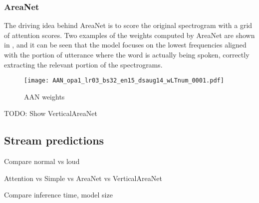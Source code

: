 \subsubsection{AreaNet}

The driving idea behind AreaNet is to score the original spectrogram with a
grid of attention scores. Two examples of the weights computed by AreaNet are
shown in , and it can be seen that the model
focuses on the lowest frequencies aligned with the portion of utterance where
the word is actually being spoken, correctly extracting the relevant portion 
of the spectrograms.

\begin{figure}[t!]
    \centering
    \texttt{[image: AAN\_opa1\_lr03\_bs32\_en15\_dsaug14\_wLTnum\_0001.pdf]}
    \caption{AAN weights}%
    \label{fig:attention_weights_area}
\end{figure}

TODO: Show VerticalAreaNet

\subsection{Stream predictions}

Compare normal vs loud

Attention vs Simple vs AreaNet vs VerticalAreaNet

Compare inference time, model size
